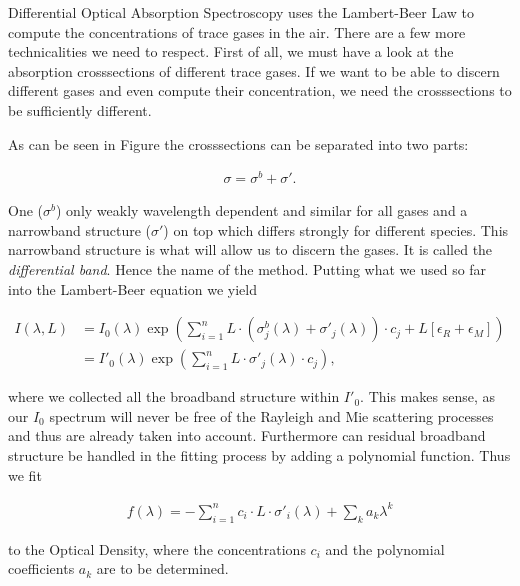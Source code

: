 Differential Optical Absorption Spectroscopy uses the Lambert-Beer Law
to compute the concentrations of trace gases in the air. There are a
few more technicalities we need to respect. First of all, we must have
a look at the absorption crosssections of different trace gases. If we
want to be able to discern different gases and even compute their
concentration, we need the crosssections to be sufficiently
different.

As can be seen in Figure  the
crosssections can be separated into two parts: 

\begin{align*}
  \sigma = \sigma^b + \sigma'.
\end{align*}

One ($\sigma^b$) only weakly
wavelength dependent and similar for all gases and a narrowband
structure ($\sigma'$) on top which differs strongly for different species. This
narrowband structure is what will allow us to discern the gases. It is
called the \emph{differential band}. Hence the name of the
method. Putting what we used so far into the Lambert-Beer equation we
yield

\begin{align*}
  I(\lambda, L) & = I_0(\lambda) \exp \left ( \sum_{i=1}^n L \cdot
                  (\sigma^b_j(\lambda) + \sigma'_j(\lambda))\cdot c_j + L[\epsilon_R +
                  \epsilon_M]\right) \\
                & = I'_0(\lambda) \exp \left( \sum_{i=1}^n L \cdot
                  \sigma'_j(\lambda) \cdot c_j \right),
\end{align*}

where we collected all the broadband structure within $I'_0$. This
makes sense, as our $I_0$ spectrum will never be free of the Rayleigh
and Mie scattering processes and thus are already taken into
account. Furthermore can residual broadband structure be handled in
the fitting process by adding a polynomial function. Thus we fit

\begin{align}
  f(\lambda) = - \sum_{i=1}^n c_i \cdot L \cdot \sigma'_i(\lambda) +
  \sum_k a_k \lambda^k \label{eq:doas-fit}
\end{align}

to the Optical Density, where the concentrations $c_i$ and the polynomial
coefficients $a_k$ are to be determined. 

